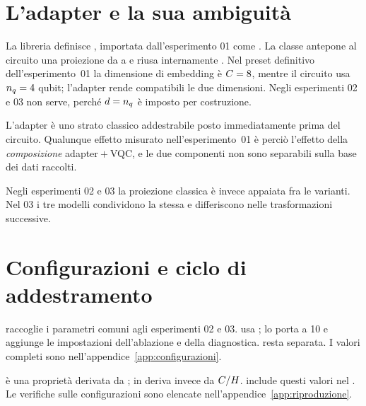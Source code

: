 \section{L'adapter e la sua ambiguità}
\label{sec:adapter}

La libreria definisce , importata
dall'esperimento 01 come . La classe antepone al
circuito una proiezione da  a  e riusa internamente
.
Nel preset definitivo dell'esperimento~01 la dimensione di embedding è
$C = 8$, mentre il circuito usa $n_q = 4$ qubit; l'adapter rende compatibili
le due dimensioni. Negli
esperimenti 02 e 03 non serve, perché $d = n_q$ è imposto per costruzione.

\begin{limite}
L'adapter è uno strato classico addestrabile posto immediatamente prima del
circuito. Qualunque effetto misurato nell'esperimento~01 è perciò l'effetto della
\emph{composizione} adapter${}+{}$VQC, e le due componenti non sono separabili
sulla base dei dati raccolti.
\end{limite}

Negli esperimenti 02 e 03 la proiezione classica è invece appaiata fra le
varianti. Nel 03 i tre modelli condividono la stessa
 e differiscono nelle trasformazioni successive.

\section{Configurazioni e ciclo di addestramento}
\label{sec:base-config}

 raccoglie i parametri comuni agli esperimenti 02 e 03.
 usa ;  lo porta a
10 e aggiunge le impostazioni dell'ablazione e della diagnostica.
 resta separata. I valori completi sono
nell'appendice~\ref{app:configurazioni}.

 è una proprietà derivata da ; in
 deriva invece da $C/H$.  include
questi valori nel . Le verifiche sulle configurazioni sono
elencate nell'appendice~\ref{app:riproduzione}.

\subsection{\texorpdfstring{}{BaseTrainer}}
\label{sec:base-trainer}

